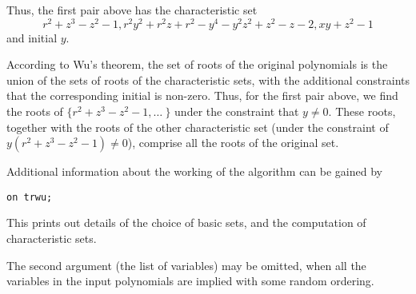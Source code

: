 Thus, the first pair above has the characteristic set
\[ r^2 + z^3 - z^2 - 1,
r^2 y^2 + r^2 z + r^2 - y^4 - y^2 z^2 + z^2 - z - 2,
x y + z^2 - 1\]
and initial $y$.

According to Wu's theorem, the set of roots of the original polynomials
is the union of the sets of roots of the characteristic sets,
with the additional constraints that the
corresponding initial is non-zero. Thus, for the first pair above, we find the
roots of $\{ r^2 + z^3 - z^2 - 1, \ldots~\}$ under the constraint that
$y \neq 0$. These roots, together with the roots of the other
characteristic set (under the constraint of $y(r^2+z^3-z^2-1) \neq 0$),
comprise all the roots of the original set.

Additional information about the working of the algorithm can be gained by
\begin{verbatim}
on trwu;
\end{verbatim}
This prints out details of the choice of basic sets, and the computation
of characteristic sets.

The second argument (the list of variables) may be omitted, when all the
variables in the input polynomials are implied with some random ordering.
